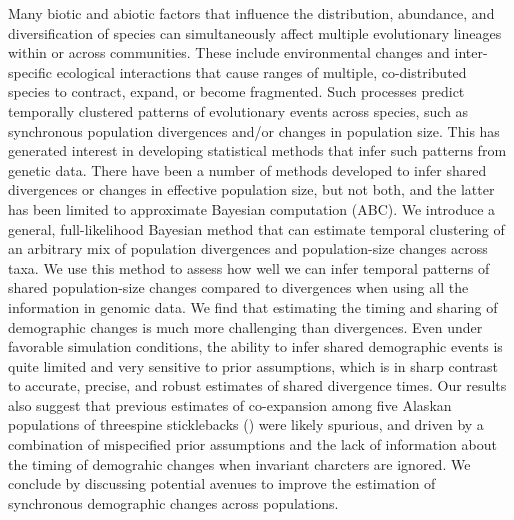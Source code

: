 Many biotic and abiotic factors that influence the distribution, abundance, and
diversification of species can simultaneously affect multiple evolutionary
lineages within or across communities.
These include environmental changes and inter-specific ecological interactions
that cause ranges of multiple, co-distributed species to contract,
expand, or become fragmented.
Such processes predict temporally clustered patterns of evolutionary events
across species, such as synchronous population divergences and/or changes in
population size.
This has generated interest in developing statistical methods that infer such
patterns from genetic data.
There have been a number of methods developed to infer shared divergences or
changes in effective population size, but not both, and the latter has been
limited to approximate Bayesian computation (ABC).
We introduce a general, full-likelihood Bayesian method that can estimate
temporal clustering of an arbitrary mix of population divergences and
population-size changes across taxa.
We use this method to assess how well we can infer temporal patterns of shared
population-size changes compared to divergences when using all the information
in genomic data.
We find that estimating the timing and sharing of demographic changes is much
more challenging than divergences.
Even under favorable simulation conditions, the ability to infer shared
demographic events is quite limited and very sensitive to prior assumptions,
which is in sharp contrast to accurate, precise, and robust estimates of shared
divergence times.
Our results also suggest that previous estimates of co-expansion among five
Alaskan populations of threespine sticklebacks ()
were likely spurious, and driven by a combination of mispecified prior
assumptions and the lack of information about the timing of demograhic changes
when invariant charcters are ignored.
We conclude by discussing potential avenues to improve the estimation of
synchronous demographic changes across populations.
